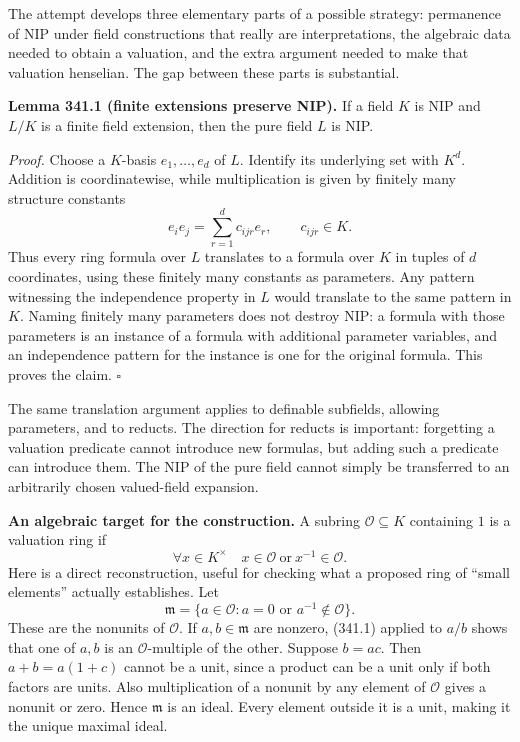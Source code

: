 \documentclass[11pt]{article}
\begin{document}
The attempt develops three elementary parts of a possible strategy: permanence of NIP under field constructions that really are interpretations, the algebraic data needed to obtain a valuation, and the extra argument needed to make that valuation henselian. The gap between these parts is substantial.

\textbf{Lemma 341.1 (finite extensions preserve NIP).} If a field $K$ is NIP and $L/K$ is a finite field extension, then the pure field $L$ is NIP.

\emph{Proof.} Choose a $K$-basis $e_1,\ldots,e_d$ of $L$. Identify its underlying set with $K^d$. Addition is coordinatewise, while multiplication is given by finitely many structure constants
\[
 e_i e_j=\sum_{r=1}^d c_{ijr}e_r,
 \qquad c_{ijr}\in K.
\]
Thus every ring formula over $L$ translates to a formula over $K$ in tuples of $d$ coordinates, using these finitely many constants as parameters. Any pattern witnessing the independence property in $L$ would translate to the same pattern in $K$. Naming finitely many parameters does not destroy NIP: a formula with those parameters is an instance of a formula with additional parameter variables, and an independence pattern for the instance is one for the original formula. This proves the claim. $\square$

The same translation argument applies to definable subfields, allowing parameters, and to reducts. The direction for reducts is important: forgetting a valuation predicate cannot introduce new formulas, but adding such a predicate can introduce them. The NIP of the pure field cannot simply be transferred to an arbitrarily chosen valued-field expansion.

\textbf{An algebraic target for the construction.} A subring $\mathcal O\subseteq K$ containing $1$ is a valuation ring if
\[
 \forall x\in K^\times\quad x\in\mathcal O\ \text{or}\ x^{-1}\in\mathcal O.
 \tag{341.1}
\]
Here is a direct reconstruction, useful for checking what a proposed ring of ``small elements'' actually establishes. Let
\[
 \mathfrak m=\{a\in\mathcal O:a=0\text{ or }a^{-1}\notin\mathcal O\}.
\]
These are the nonunits of $\mathcal O$. If $a,b\in\mathfrak m$ are nonzero, (341.1) applied to $a/b$ shows that one of $a,b$ is an $\mathcal O$-multiple of the other. Suppose $b=ac$. Then $a+b=a(1+c)$ cannot be a unit, since a product can be a unit only if both factors are units. Also multiplication of a nonunit by any element of $\mathcal O$ gives a nonunit or zero. Hence $\mathfrak m$ is an ideal. Every element outside it is a unit, making it the unique maximal ideal.
\end{document}
